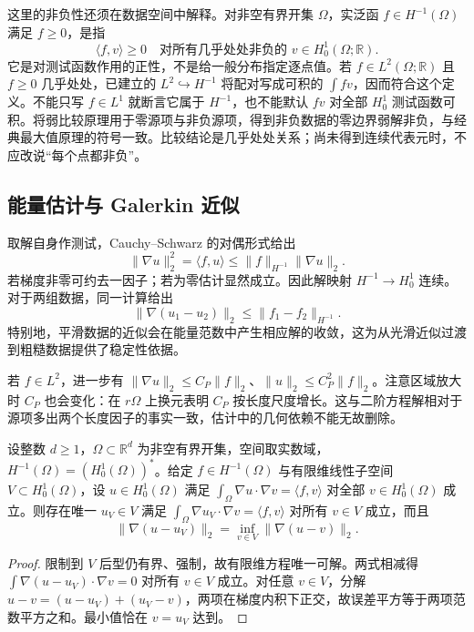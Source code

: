 这里的非负性还须在数据空间中解释。对非空有界开集 \(\Omega\)，实泛函 \(f\in H^{-1}(\Omega)\) 满足 \(f\geq0\)，是指
\[
 \langle f,v\rangle\geq0
 \quad\text{对所有几乎处处非负的 }v\in H_0^1(\Omega;\mathbb R).
\]
它是对测试函数作用的正性，不是给一般分布指定逐点值。若 \(f\in L^2(\Omega;\mathbb R)\) 且 \(f\geq0\) 几乎处处，已建立的 \(L^2\hookrightarrow H^{-1}\) 将配对写成可积的 \(\int fv\)，因而符合这个定义。不能只写 \(f\in L^1\) 就断言它属于 \(H^{-1}\)，也不能默认 \(fv\) 对全部 \(H_0^1\) 测试函数可积。将弱比较原理用于零源项与非负源项，得到非负数据的零边界弱解非负，与经典最大值原理的符号一致。比较结论是几乎处处关系；尚未得到连续代表元时，不应改说“每个点都非负”。

\subsection{能量估计与 Galerkin 近似}
\label{b2:subsec:150303}

取解自身作测试，Cauchy--Schwarz 的对偶形式给出
\[\lVert\nabla u\rVert_2^2=\langle f,u\rangle
 \le\lVert f\rVert_{H^{-1}}\lVert\nabla u\rVert_2.\]
若梯度非零可约去一因子；若为零估计显然成立。因此解映射 \(H^{-1}\to H_0^1\) 连续。对于两组数据，同一计算给出
\[\lVert\nabla(u_1-u_2)\rVert_2\le\lVert f_1-f_2\rVert_{H^{-1}}.\]
特别地，平滑数据的近似会在能量范数中产生相应解的收敛，这为从光滑近似过渡到粗糙数据提供了稳定性依据。

\ProseParagraphBreak

若 \(f\in L^2\)，进一步有 \(\lVert\nabla u\rVert_2\le C_P\lVert f\rVert_2\)、\(\lVert u\rVert_2\le C_P^2\lVert f\rVert_2\)。注意区域放大时 \(C_P\) 也会变化：在 \(r\Omega\) 上换元表明 \(C_P\) 按长度尺度增长。这与二阶方程解相对于源项多出两个长度因子的事实一致，估计中的几何依赖不能无故删除。

\begin{proposition}[有限维近似的最佳误差]
\label{b2:prop:15-galerkin-poisson}
设整数 \(d\geq1\)，\(\Omega\subset\mathbb R^d\) 为非空有界开集，空间取实数域，\(H^{-1}(\Omega)=(H_0^1(\Omega))^*\)。给定 \(f\in H^{-1}(\Omega)\) 与有限维线性子空间 \(V\subset H_0^1(\Omega)\)，设 \(u\in H_0^1(\Omega)\) 满足 \(\int_\Omega\nabla u\cdot\nabla v=\langle f,v\rangle\) 对全部 \(v\in H_0^1(\Omega)\) 成立。则存在唯一 \(u_V\in V\) 满足 \(\int_\Omega\nabla u_V\cdot\nabla v=\langle f,v\rangle\) 对所有 \(v\in V\) 成立，而且
\[\lVert\nabla(u-u_V)\rVert_2=\inf_{v\in V}\lVert\nabla(u-v)\rVert_2.\]
\end{proposition}
\begin{proof}
限制到 \(V\) 后型仍有界、强制，故有限维方程唯一可解。两式相减得 \(\int\nabla(u-u_V)\cdot\nabla v=0\) 对所有 \(v\in V\) 成立。对任意 \(v\in V\)，分解 \(u-v=(u-u_V)+(u_V-v)\)，两项在梯度内积下正交，故误差平方等于两项范数平方之和。最小值恰在 \(v=u_V\) 达到。
\end{proof}

